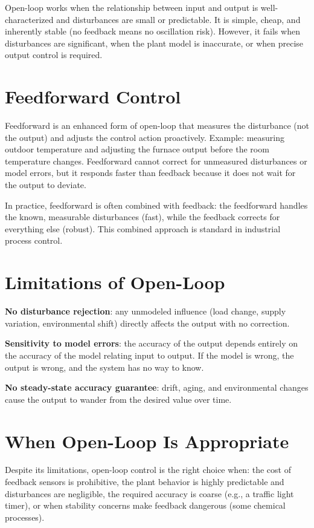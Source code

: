\documentclass[11pt,letterpaper,twoside,openany]{book}
\begin{document}
Open-loop works when the relationship between input and output is well-characterized and disturbances are small or predictable. It is simple, cheap, and inherently stable (no feedback means no oscillation risk). However, it fails when disturbances are significant, when the plant model is inaccurate, or when precise output control is required.

\section{Feedforward Control}
Feedforward is an enhanced form of open-loop that measures the disturbance (not the output) and adjusts the control action proactively. Example: measuring outdoor temperature and adjusting the furnace output before the room temperature changes. Feedforward cannot correct for unmeasured disturbances or model errors, but it responds faster than feedback because it does not wait for the output to deviate.

In practice, feedforward is often combined with feedback: the feedforward handles the known, measurable disturbances (fast), while the feedback corrects for everything else (robust). This combined approach is standard in industrial process control.

\section{Limitations of Open-Loop}
\textbf{No disturbance rejection}: any unmodeled influence (load change, supply variation, environmental shift) directly affects the output with no correction.

\textbf{Sensitivity to model errors}: the accuracy of the output depends entirely on the accuracy of the model relating input to output. If the model is wrong, the output is wrong, and the system has no way to know.

\textbf{No steady-state accuracy guarantee}: drift, aging, and environmental changes cause the output to wander from the desired value over time.

\section{When Open-Loop Is Appropriate}
Despite its limitations, open-loop control is the right choice when: the cost of feedback sensors is prohibitive, the plant behavior is highly predictable and disturbances are negligible, the required accuracy is coarse (e.g., a traffic light timer), or when stability concerns make feedback dangerous (some chemical processes).
\end{document}

